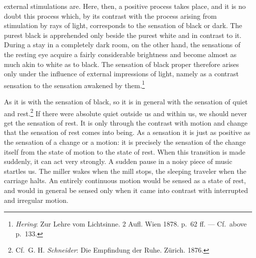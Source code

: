 \documentclass[12pt,a4paper]{book}
\newcommand{\opage}[1]{\marginnote{\footnotesize\textit{[#1]}}}
\begin{document}
external stimulations are. Here, then, a positive process takes place,
and it is no doubt this process which, by its contrast with the process
arising from stimulation by rays of light, corresponds to the sensation
of black or dark. The purest black is apprehended only beside the purest
white and in contrast to it. During a stay in a completely dark room, on
the other hand, the sensations of the resting eye acquire a fairly
considerable brightness and become almost as much akin to white as to
black. The sensation of black proper therefore arises only under the
influence of external impressions of light, namely as a contrast
sensation to the
sensation awakened by them.\footnote{\emph{Hering}: Zur Lehre vom
Lichtsinne. 2 Aufl. Wien 1878. p.~62 ff. --- Cf.\ above p.~133.}

As it is with the sensation of black, so it is in general with the
sensation of quiet and rest.\footnote{Cf.\ G. H. \emph{Schneider}: Die
Empfindung der Ruhe. Zürich. 1876.} If there were absolute quiet outside
us and within us, we should never get the sensation of rest. It is only
through the contrast with motion and change that the sensation of rest
comes into being. As a sensation it is just as positive as the sensation
of a change or a motion: it is precisely the sensation of the change
itself from the state of motion to the state of rest. When this
transition is made suddenly, it can act very strongly. A sudden pause
in a noisy piece of music startles us. The miller wakes when the mill
stops, the sleeping traveler when the carriage halts. An entirely
\opage{138}continuous motion would be sensed as a state of rest, and
would in general be sensed only when it came into contrast with
interrupted and irregular motion.
\end{document}
